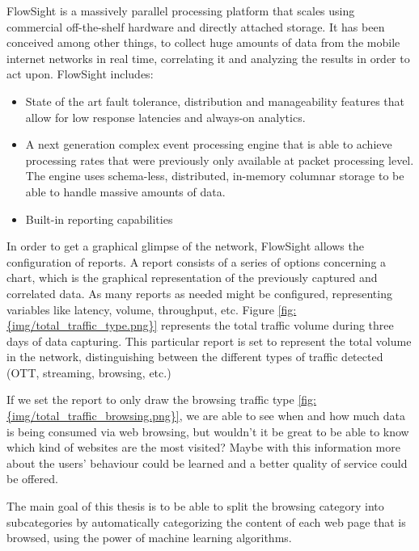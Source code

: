
FlowSight is a massively parallel processing platform that scales using commercial off-the-shelf hardware and directly attached storage. It has been conceived among other things, to collect
huge amounts of data from the mobile internet networks in real time, correlating it and analyzing the results in order to act upon. FlowSight includes:
\begin{itemize}
  \item{State of the art fault tolerance, distribution and manageability features that allow for low response latencies and always-on analytics.}
  \item{A next generation complex event processing engine that is able to achieve processing rates that were previously only available at packet processing level. The engine uses schema-less, 
        distributed, in-memory columnar storage to be able to handle massive amounts of data.}
  \item{Built-in reporting capabilities}
\end{itemize}
In order to get a graphical glimpse of the network, FlowSight allows the configuration of reports. A report consists of a series of options concerning a chart, which is the graphical representation
of the previously captured and correlated data. As many reports as needed might be configured, representing variables like latency, volume, throughput, etc.   
Figure \ref{fig:{img/total_traffic_type.png}} represents the total traffic volume during three days of data capturing. This particular report is set to represent the total volume in the network, 
distinguishing between the different types of traffic detected (OTT, streaming, browsing, etc.)

If we set the report to only draw the browsing traffic type \ref{fig:{img/total_traffic_browsing.png}}, we are able to see when and how much data is being consumed via web browsing, but wouldn't it be 
great to be able to know which kind of websites are the most visited? Maybe with this information more about the users' behaviour could be learned and a better quality of service could be offered.


The main goal of this thesis is to be able to split the browsing category into subcategories by automatically categorizing the content of each web page that is browsed, using the power of machine learning
algorithms.


